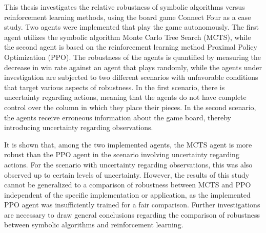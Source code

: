 This thesis investigates the relative robustness of symbolic algorithms versus reinforcement learning methods, using the board game Connect Four as a case study. Two agents were implemented that play the game autonomously. The first agent utilizes the symbolic algorithm Monte Carlo Tree Search (MCTS), while the second agent is based on the reinforcement learning method Proximal Policy Optimization (PPO). The robustness of the agents is quantified by measuring the decrease in win rate against an agent that plays randomly, while the agents under investigation are subjected to two different scenarios with unfavorable conditions that target various aspects of robustness. In the first scenario, there is uncertainty regarding actions, meaning that the agents do not have complete control over the column in which they place their pieces. In the second scenario, the agents receive erroneous information about the game board, thereby introducing uncertainty regarding observations.

It is shown that, among the two implemented agents, the MCTS agent is more robust than the PPO agent in the scenario involving uncertainty regarding actions. For the scenario with uncertainty regarding observations, this was also observed up to certain levels of uncertainty. However, the results of this study cannot be generalized to a comparison of robustness between MCTS and PPO independent of the specific implementation or application, as the implemented PPO agent was insufficiently trained for a fair comparison. Further investigations are necessary to draw general conclusions regarding the comparison of robustness between symbolic algorithms and reinforcement learning.

\newpage